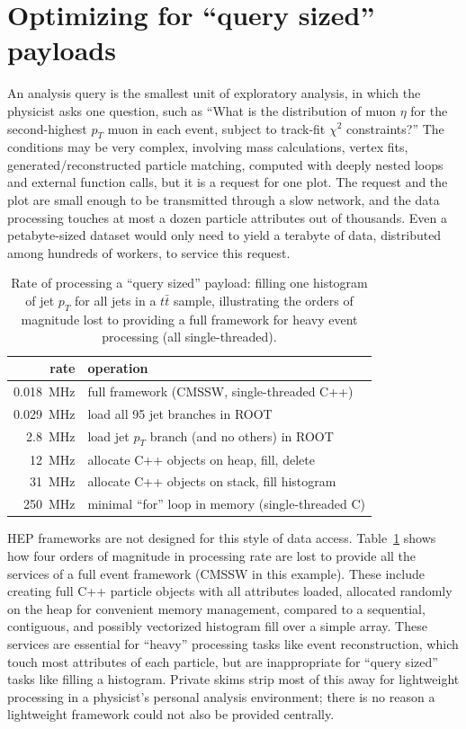 \documentclass[a4paper]{jpconf}
\begin{document}
\section{Optimizing for ``query sized'' payloads}

An analysis query is the smallest unit of exploratory analysis, in which the physicist asks one question, such as ``What is the distribution of muon $\eta$ for the second-highest $p_T$ muon in each event, subject to track-fit $\chi^2$ constraints?'' The conditions may be very complex, involving mass calculations, vertex fits, generated/reconstructed particle matching, computed with deeply nested loops and external function calls, but it is a request for one plot. The request and the plot are small enough to be transmitted through a slow network, and the data processing touches at most a dozen particle attributes out of thousands. Even a petabyte-sized dataset would only need to yield a terabyte of data, distributed among hundreds of workers, to service this request.

\begin{table}
\caption{\label{tab:10k} Rate of processing a ``query sized'' payload: filling one histogram of jet $p_T$ for all jets in a $t\bar{t}$ sample, illustrating the orders of magnitude lost to providing a full framework for heavy event processing (all single-threaded).}

\begin{center}
\renewcommand{\arraystretch}{1.1}
\begin{tabular}{r l}
rate & operation \\\hline
0.018~MHz & full framework (CMSSW, single-threaded C++) \\
0.029~MHz & load all 95 jet branches in ROOT \\
2.8~MHz & load jet $p_T$ branch (and no others) in ROOT \\
12~MHz & allocate C++ objects on heap, fill, delete \\
31~MHz & allocate C++ objects on stack, fill histogram \\
250~MHz & minimal ``for'' loop in memory (single-threaded C)
\end{tabular}
\end{center}
\vspace{-0.75 cm}
\end{table}

HEP frameworks are not designed for this style of data access. Table~\ref{tab:10k} shows how four orders of magnitude in processing rate are lost to provide all the services of a full event framework (CMSSW in this example). These include creating full C++ particle objects with all attributes loaded, allocated randomly on the heap for convenient memory management, compared to a sequential, contiguous, and possibly vectorized histogram fill over a simple array. These services are essential for ``heavy'' processing tasks like event reconstruction, which touch most attributes of each particle, but are inappropriate for ``query sized'' tasks like filling a histogram. Private skims strip most of this away for lightweight processing in a physicist's personal analysis environment; there is no reason a lightweight framework could not also be provided centrally.
\end{document}

